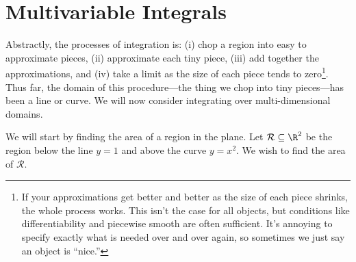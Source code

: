 \section{Multivariable Integrals}

Abstractly, the processes of integration is:
(i) chop a region into easy to 
approximate pieces, (ii) approximate each tiny piece, (iii) add together
the approximations, and (iv) take a limit as the size of each piece tends to zero\footnote{
If your approximations get better and better as the size of each piece shrinks,
the whole process works.  This isn't the case for all objects, but conditions like
differentiability and piecewise smooth are often sufficient.  It's annoying
to specify exactly what is needed over and over again, so sometimes we just say
an object is ``nice.''}.
 Thus far, the domain of this procedure---the
thing we chop into tiny pieces---has been a line or curve.  We will now consider
integrating over multi-dimensional domains.

We will start by finding the area of a region in the plane.
Let $\mathcal R\subseteq \R^2$ be the region below the line $y=1$ and above the
curve $y=x^2$.  We wish to find the area of $\mathcal R$.


\begin{center}
\end{center}

